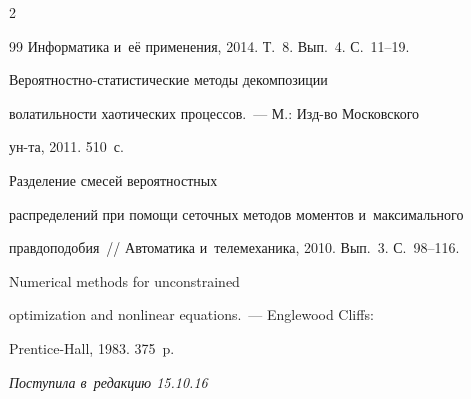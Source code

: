 \begin{multicols}{2}
{{\begin{thebibliography}{99}
    Информатика и~её применения, 2014. Т.~8. Вып.~4. С.~11--19.


    




 Вероятностно-статистические методы декомпозиции


    волатильности хаотических процессов.~--- М.: Изд-во Московского


    ун-та, 2011. 510~с.


    




 Разделение смесей вероятностных


    распределений при помощи сеточных методов моментов и~максимального


    правдоподобия~// Автоматика и~телемеханика, 2010. Вып.~3. С.~98--116.


    




 Numerical methods for unconstrained


    optimization and nonlinear equations.~--- Englewood Cliffs:


    Prentice-Hall, 1983. 375~p.


 \end{thebibliography}





 }


 }





\end{multicols}





\vspace*{-3pt}





\hfill{\small\textit{Поступила в~редакцию 15.10.16}}





\vspace*{8pt}





